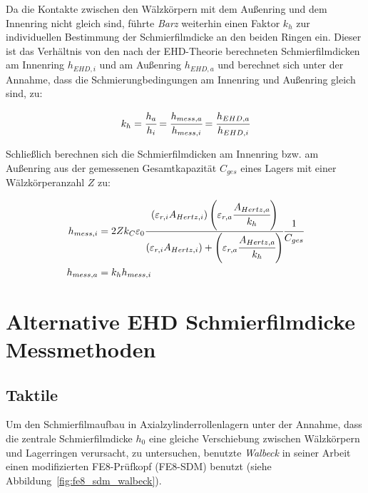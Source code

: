 Da die Kontakte zwischen den Wälzkörpern mit dem Außenring und dem Innenring nicht gleich sind, führte \textit{Barz} weiterhin einen Faktor $k_h$ zur individuellen Bestimmung der Schmierfilmdicke an den beiden Ringen ein.
Dieser ist das Verhältnis von den nach der EHD-Theorie berechneten Schmierfilmdicken am Innenring $h_{EHD,i}$ und am Außenring $h_{EHD,a}$ und berechnet sich unter der Annahme, dass die Schmierungbedingungen am Innenring und Außenring gleich sind, zu:

\begin{equation}
    k_h = \cfrac{h_a}{h_i} = \cfrac{h_{mess,a}}{h_{mess,i}} = \cfrac{h_{EHD,a}}{h_{EHD,i}}
    \label{eq:kh_faktor}
\end{equation}

Schließlich berechnen sich die Schmierfilmdicken am Innenring bzw. am Außenring aus der gemessenen Gesamtkapazität $C_{ges}$ eines Lagers mit einer Wälzkörperanzahl $Z$ zu:

\begin{align}
    h_{mess,i} &= 2 Z k_C \varepsilon_0 
                \cfrac{(\varepsilon_{r,i} A_{Hertz,i}) \left( \varepsilon_{r,a} \cfrac{A_{Hertz,a}}{k_h} \right) }
                      {(\varepsilon_{r,i} A_{Hertz,i}) + \left( \varepsilon_{r,a} \cfrac{A_{Hertz,a}}{k_h} \right) }
                \cfrac{1}{C_{ges}} \\
    h_{mess,a} &= k_h h_{mess,i}
\end{align}

\section{Alternative EHD Schmierfilmdicke Messmethoden}
\label{sec:alternative_messmethoden}

\subsection{Taktile}
\label{sub:taktil}

Um den Schmierfilmaufbau in Axialzylinderrollenlagern unter der Annahme, dass die zentrale Schmierfilmdicke $h_0$ eine gleiche Verschiebung zwischen Wälzkörpern und Lagerringen verursacht, zu untersuchen, benutzte \textit{Walbeck} in seiner Arbeit~\cite{Walbeck_2004} einen modifizierten FE8-Prüfkopf (FE8-SDM) benutzt (siehe Abbildung~\ref{fig:fe8_sdm_walbeck}).

